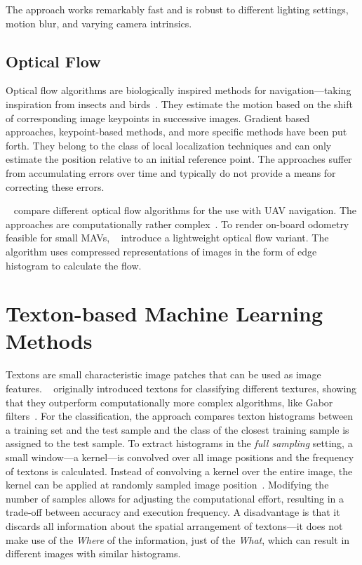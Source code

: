 \documentclass{report}
\begin{document}
The approach works remarkably fast and is robust to different lighting
settings, motion blur, and varying camera intrinsics.

\subsection{Optical Flow}
\label{sec:opticalflow}

Optical flow algorithms are biologically inspired methods for
navigation---taking inspiration from insects and
birds~\cite{ruffier2003bio}. They estimate the motion based on the
shift of corresponding image keypoints in successive images. Gradient
based approaches, keypoint-based methods, and more specific methods
have been put forth.  They belong to the class of
local localization techniques and can only estimate the position
relative to an initial reference point. The approaches suffer from
accumulating errors over time and typically do not provide a means for
correcting these errors.

\citeauthor{chao2013survey}~\cite{chao2013survey} compare different
optical flow algorithms for the use with UAV navigation. The
approaches are computationally rather
complex~\cite{mcguire2016local}. To render on-board odometry feasible
for small MAVs, \citeauthor{mcguire2016local}~\cite{mcguire2016local}
introduce a lightweight optical flow variant. The algorithm uses
compressed representations of images in the form of edge histogram to
calculate the flow. 

\section{Texton-based Machine Learning Methods}
\label{sec:textonbasedapproaches}

Textons are small characteristic image patches that can be used as
image
features. \citeauthor{varma2005statistical}~\cite{varma2005statistical}
originally introduced textons for classifying different textures,
showing that they outperform computationally more complex algorithms,
like Gabor filters~\cite{varma2005statistical}. For the
classification, the approach compares texton histograms between a
training set and the test sample and the class of the closest training
sample is assigned to the test sample. To extract histograms in the
\emph{full sampling} setting, a small window---a kernel---is convolved
over all image positions and the frequency of textons is calculated.
Instead of convolving a kernel over the entire image, the kernel can
be applied at randomly sampled image
position~\cite{de2012sub}. %
Modifying the number of samples allows for adjusting the computational
effort, resulting in a trade-off between accuracy and execution
frequency. A disadvantage is that it discards all information about
the spatial arrangement of textons---it does not make use of the
\emph{Where} of the information, just of the \emph{What}, which can
result in different images with similar histograms.
\end{document}
